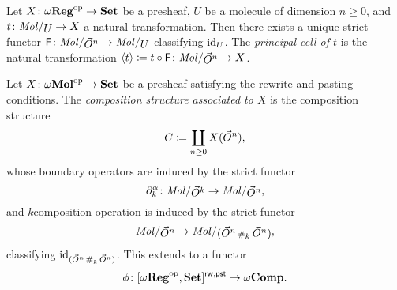 \begin{dfn}
    Let \( X \colon \omega\mathbf{Reg}^\mathrm{op} \to \mathbf{Set} \) be a presheaf, \( U \) be a molecule of dimension \( n \geq 0 \), and \( t \colon \molecin{U} \to X \) a natural transformation.
    Then there exists a unique strict functor \( \F \colon \molecin{\dglobe{n}} \to \molecin{U} \) classifying \( \mathrm{id}_{U} \).
    The \emph{principal cell of \( t \)} is the natural transformation \( \pcell{t} \eqdef t \after \F \colon \molecin{\dglobe{n}} \to X \).
\end{dfn}

\begin{dfn}
    Let \( X \colon \omega\mathbf{Mol}^\mathrm{op} \to \mathbf{Set} \) be a presheaf satisfying the rewrite and pasting conditions.
    The \emph{composition structure associated to \( X \)} is the composition structure 
    \begin{equation*}
        C \coloneqq \coprod_{n \geq 0} X(\vec{O}^{n}),
    \end{equation*}
    whose boundary operators are induced by the strict functor
    \begin{equation*}
        \bd{k}{\a} \colon \molecin{\dglobe{k}} \to \molecin{\dglobe{n}}, 
    \end{equation*}
    and \( k \)\nbd composition operation is induced by the strict functor
    \begin{equation*}
        \molecin{\dglobe{n}} \to \molecin{(\dglobe{n} \cp{k} \dglobe{n})},
    \end{equation*}
    classifying \( \mathrm{id}_{(\vec{O}^{n} \,{\scriptstyle\#}_{k}\, \vec{O}^{n})} \).
    This extends to a functor 
    \begin{equation*}
        \phi \colon [\omega\mathbf{Reg}^\mathrm{op}, \mathbf{Set}]^{\mathsf{rw, pst}} \to \omega\mathbf{Comp}.
    \end{equation*}
\end{dfn}

